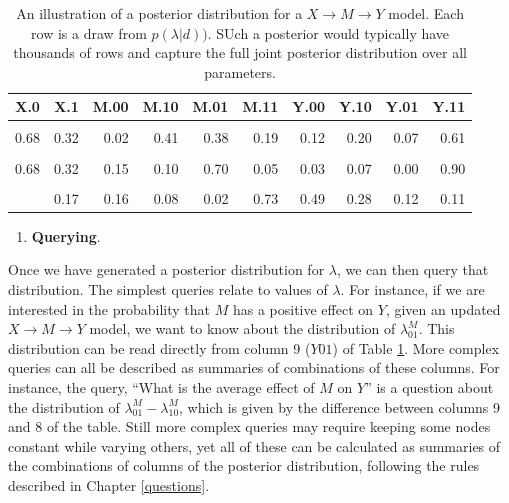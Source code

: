 \documentclass[
  12pt,
]{book}
\providecommand{\tightlist}{%
  \setlength{\itemsep}{0pt}\setlength{\parskip}{0pt}}
\begin{document}
\begin{table}

\caption{\label{tab:posteriortable}An illustration of a posterior distribution for a $X \rightarrow M \rightarrow Y$ model. Each row is a draw from $p(\lambda|d))$. SUch a posterior would typically have thousands of rows and capture the full joint posterior distribution over all parameters.}
\centering
\begin{tabular}[t]{rrrrrrrrrr}
\toprule
X.0 & X.1 & M.00 & M.10 & M.01 & M.11 & Y.00 & Y.10 & Y.01 & Y.11\\
\midrule
\cellcolor{gray!6}{0.47} & \cellcolor{gray!6}{0.53} & \cellcolor{gray!6}{0.21} & \cellcolor{gray!6}{0.07} & \cellcolor{gray!6}{0.17} & \cellcolor{gray!6}{0.55} & \cellcolor{gray!6}{0.20} & \cellcolor{gray!6}{0.23} & \cellcolor{gray!6}{0.15} & \cellcolor{gray!6}{0.41}\\
0.68 & 0.32 & 0.02 & 0.41 & 0.38 & 0.19 & 0.12 & 0.20 & 0.07 & 0.61\\
\cellcolor{gray!6}{0.33} & \cellcolor{gray!6}{0.67} & \cellcolor{gray!6}{0.16} & \cellcolor{gray!6}{0.45} & \cellcolor{gray!6}{0.27} & \cellcolor{gray!6}{0.12} & \cellcolor{gray!6}{0.08} & \cellcolor{gray!6}{0.02} & \cellcolor{gray!6}{0.81} & \cellcolor{gray!6}{0.09}\\
0.68 & 0.32 & 0.15 & 0.10 & 0.70 & 0.05 & 0.03 & 0.07 & 0.00 & 0.90\\
\cellcolor{gray!6}{0.17} & \cellcolor{gray!6}{0.83} & \cellcolor{gray!6}{0.02} & \cellcolor{gray!6}{0.11} & \cellcolor{gray!6}{0.64} & \cellcolor{gray!6}{0.22} & \cellcolor{gray!6}{0.44} & \cellcolor{gray!6}{0.06} & \cellcolor{gray!6}{0.30} & \cellcolor{gray!6}{0.20}\\
\addlinespace
0.83 & 0.17 & 0.16 & 0.08 & 0.02 & 0.73 & 0.49 & 0.28 & 0.12 & 0.11\\
\bottomrule
\end{tabular}
\end{table}

\begin{enumerate}
\def\labelenumi{\arabic{enumi}.}
\setcounter{enumi}{4}
\tightlist
\item
  \textbf{Querying}.
\end{enumerate}

Once we have generated a posterior distribution for \(\lambda\), we can then query that distribution. The simplest queries relate to values of \(\lambda\). For instance, if we are interested in the probability that \(M\) has a positive effect on \(Y\), given an updated \(X \rightarrow M \rightarrow Y\) model, we want to know about the distribution of \(\lambda^M_{01}\). This distribution can be read directly from column 9 (\(Y01\)) of Table \ref{tab:posteriortable}. More complex queries can all be described as summaries of combinations of these columns. For instance, the query, ``What is the average effect of \(M\) on \(Y\)'' is a question about the distribution of \(\lambda^M_{01} - \lambda^M_{10}\), which is given by the difference between columns 9 and 8 of the table. Still more complex queries may require keeping some nodes constant while varying others, yet all of these can be calculated as summaries of the combinations of columns of the posterior distribution, following the rules described in Chapter \ref{questions}.
\end{document}
